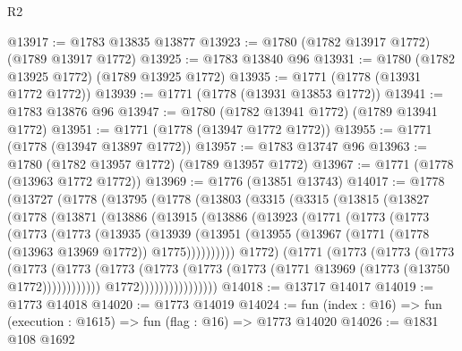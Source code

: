 \begin{lexlean}{R2}
\begin{coremodule}
@13917 := @1783 @13835 @13877
@13923 := @1780 (@1782 @13917 @1772) (@1789 @13917 @1772)
@13925 := @1783 @13840 @96
@13931 := @1780 (@1782 @13925 @1772) (@1789 @13925 @1772)
@13935 := @1771 (@1778 (@13931 @1772 @1772))
@13939 := @1771 (@1778 (@13931 @13853 @1772))
@13941 := @1783 @13876 @96
@13947 := @1780 (@1782 @13941 @1772) (@1789 @13941 @1772)
@13951 := @1771 (@1778 (@13947 @1772 @1772))
@13955 := @1771 (@1778 (@13947 @13897 @1772))
@13957 := @1783 @13747 @96
@13963 := @1780 (@1782 @13957 @1772) (@1789 @13957 @1772)
@13967 := @1771 (@1778 (@13963 @1772 @1772))
@13969 := @1776 (@13851 @13743)
@14017 := @1778
    (@13727
      (@1778
        (@13795
          (@1778
            (@13803
              (@3315
                (@3315
                  (@13815
                    (@13827
                      (@1778
                        (@13871
                          (@13886
                            (@13915
                              (@13886
                                (@13923
                                  (@1771
                                    (@1773
                                      (@1773
                                        (@1773
                                          (@1773
                                            (@13935
                                              (@13939
                                                (@13951
                                                  (@13955
                                                    (@13967
                                                      (@1771
                                                        (@1778 (@13963 @13969 @1772))
                                                        @1775))))))))))
                                    @1772)
                                  (@1771
                                    (@1773
                                      (@1773
                                        (@1773
                                          (@1773
                                            (@1773
                                              (@1773
                                                (@1773
                                                  (@1773
                                                    (@1773
                                                      (@1771 @13969 (@1773 (@13750 @1772))))))))))))
                                    @1772))))))))))))))))
@14018 := @13717 @14017
@14019 := @1773 @14018
@14020 := @1773 @14019
@14024 := fun (index : @16) => fun (execution : @1615) => fun (flag : @16) => @1773 @14020
@14026 := @1831 @108 @1692

\end{coremodule}
\end{lexlean}
